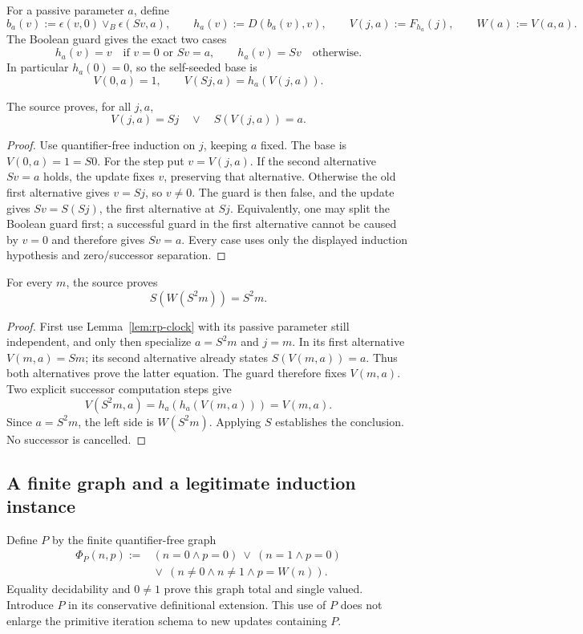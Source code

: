 For a passive parameter $a$, define
\[
 b_a(v):=\epsilon(v,0)\lor_B\epsilon(Sv,a),\qquad
 h_a(v):=D(b_a(v),v),\qquad
 V(j,a):=F_{h_a}(j),\qquad W(a):=V(a,a).
\]
The Boolean guard gives the exact two cases
\[
 h_a(v)=v\quad\text{if }v=0\text{ or }Sv=a,\qquad
 h_a(v)=Sv\quad\text{otherwise}.
\]
In particular $h_a(0)=0$, so the self-seeded base is
\[
 V(0,a)=1,\qquad V(Sj,a)=h_a(V(j,a)).
\]

\begin{lemma}
\label{lem:rp-clock}
The source proves, for all $j,a$,
\[
                       V(j,a)=Sj\quad\lor\quad S(V(j,a))=a.
\]
\end{lemma}
\begin{proof}
Use quantifier-free induction on $j$, keeping $a$ fixed. The base is
$V(0,a)=1=S0$. For the step put $v=V(j,a)$. If the second alternative
$Sv=a$ holds, the update fixes $v$, preserving that alternative. Otherwise
the old first alternative gives $v=Sj$, so $v\ne0$. The guard is then
false, and the update gives $Sv=S(Sj)$, the first alternative at $Sj$.
Equivalently, one may split the Boolean guard first; a successful guard
in the first alternative cannot be caused by $v=0$ and therefore gives
$Sv=a$. Every case uses only the displayed induction hypothesis and
zero/successor separation.
\end{proof}

\begin{lemma}
\label{lem:rp-double}
For every $m$, the source proves
\[
                         S(W(S^2m))=S^2m.
\]
\end{lemma}
\begin{proof}
First use Lemma~\ref{lem:rp-clock} with its passive parameter still
independent, and only then specialize $a=S^2m$ and $j=m$. In its first
alternative $V(m,a)=Sm$; its second alternative already states
$S(V(m,a))=a$. Thus both alternatives prove the latter equation.
The guard therefore fixes $V(m,a)$. Two explicit successor computation
steps give
\[
 V(S^2m,a)=h_a(h_a(V(m,a)))=V(m,a).
\]
Since $a=S^2m$, the left side is $W(S^2m)$. Applying $S$ establishes
the conclusion. No successor is cancelled.
\end{proof}

\subsection{A finite graph and a legitimate induction instance}

Define $P$ by the finite quantifier-free graph
\[
\begin{split}
 \Phi_P(n,p):={}&(n=0\land p=0)\ \lor\ (n=1\land p=0)\\
 &{}\lor\ (n\ne0\land n\ne1\land p=W(n)).
\end{split}
\]
Equality decidability and $0\ne1$ prove this graph total and single
valued. Introduce $P$ in its conservative definitional extension.
This use of $P$ does not enlarge the primitive iteration schema to new
updates containing $P$.


